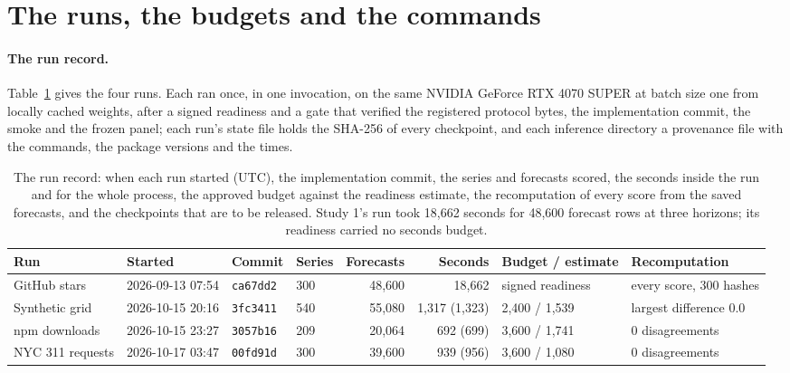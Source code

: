 \providecommand{\lm}{\texttt{local\_mean\_28}}
\providecommand{\aets}{\texttt{autoets\_weekly}}
\providecommand{\qs}{QScore9}
\providecommand{\hc}{\texttt{hurdle\_count\_28}}

\section{The runs, the budgets and the commands}
\label{app:runs}

\paragraph{The run record.} Table~\ref{tab:runs} gives the four runs. Each ran once, in one invocation, on
the same NVIDIA GeForce RTX 4070 SUPER at batch size one from locally cached weights, after a signed readiness
and a gate that verified the registered protocol bytes, the implementation commit, the smoke and the frozen
panel; each run's state file holds the SHA-256 of every checkpoint, and each inference directory a provenance
file with the commands, the package versions and the times.

\begin{table}[htbp]
\centering\footnotesize\setlength{\tabcolsep}{2pt}
\caption{The run record: when each run started (UTC), the implementation commit, the series and forecasts
scored, the seconds inside the run and for the whole process, the approved budget against the readiness
estimate, the recomputation of every score from the saved forecasts, and the checkpoints that are to be
released. Study 1's run took 18,662 seconds for 48,600 forecast rows at three horizons; its readiness carried
no seconds budget.}
\label{tab:runs}
\begin{tabular}{llllrrll}
\toprule
Run & Started & Commit & Series & Forecasts & Seconds & Budget / estimate & Recomputation \\
\midrule
GitHub stars & 2026-09-13 07:54 & \texttt{ca67dd2} & 300 & 48,600 & 18,662 & signed readiness & every score, 300 hashes \\
Synthetic grid & 2026-10-15 20:16 & \texttt{3fc3411} & 540 & 55,080 & 1,317 (1,323) & 2,400 / 1,539 & largest difference 0.0 \\
npm downloads & 2026-10-15 23:27 & \texttt{3057b16} & 209 & 20,064 & 692 (699) & 3,600 / 1,741 & 0 disagreements \\
NYC 311 requests & 2026-10-17 03:47 & \texttt{00fd91d} & 300 & 39,600 & 939 (956) & 3,600 / 1,080 & 0 disagreements \\
\bottomrule
\end{tabular}
\end{table}

